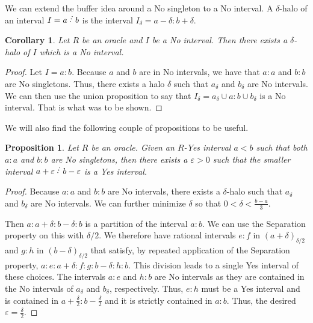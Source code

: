 \documentclass[12pt]{article}
\newtheorem{corollary}{Corollary}[subsection]
\newtheorem{proposition}{Proposition}[subsection]
\begin{document}
We can extend the buffer idea around a No singleton to a No interval. A $\delta$-halo of an interval $I= a\lte b$ is the interval $I_\delta = a - \delta:b+\delta$.

\begin{corollary}
    Let $R$ be an oracle and $I$ be a No interval. Then there exists a $\delta$-halo of $I$ which is a No interval. 
\end{corollary}

\begin{proof}
    Let $I = a:b$. Because $a$ and $b$ are in No intervals, we have that $a:a$ and $b:b$ are No singletons. Thus, there exists a halo $\delta$ such that $a_\delta$ and $b_\delta$ are No intervals. We can then use the union proposition to say that $I_\delta = a_\delta \cup a:b \cup b_\delta$ is a No interval. That is what was to be shown. 
\end{proof}

We will also find the following couple of propositions to be useful. 

\begin{proposition}\label{pr:subinter}
Let $R$ be an oracle. Given an $R$-Yes interval $a\lt b$ such that both $a:a$ and $b:b$ are No singletons, then there exists a $\varepsilon> 0$ such that the smaller interval $a+\varepsilon \lte b-\varepsilon$ is a Yes interval. 
\end{proposition}

\begin{proof}
Because $a:a$ and $b:b$ are No intervals, there exists a $\delta$-halo such that $a_\delta$ and $b_\delta$ are No intervals. We can further minimize $\delta$ so that  $0 < \delta < \frac{b-a}{3}$.

Then $a:a+\delta:b-\delta:b$ is a partition of the interval $a:b$. We can use the Separation property on this with $\delta/2$. We therefore have rational intervals $e:f$ in $(a+\delta)_{\delta/2}$ and $g:h$ in $(b-\delta)_{\delta/2}$ that satisfy, by repeated application of the Separation property,  $a:e:a+\delta:f:g:b-\delta:h:b$. This division leads to a single Yes interval of these choices. The intervals $a:e$ and $h:b$ are No intervals as they are contained in the No intervals of $a_\delta$ and $b_\delta$, respectively. Thus, $e:h$ must be a Yes interval and is contained in $a+\frac{\delta}{2}:b-\frac{\delta}{2}$ and it is strictly contained in $a:b$. Thus, the desired $\varepsilon = \frac{\delta}{2}$.

\end{proof}
\end{document}
